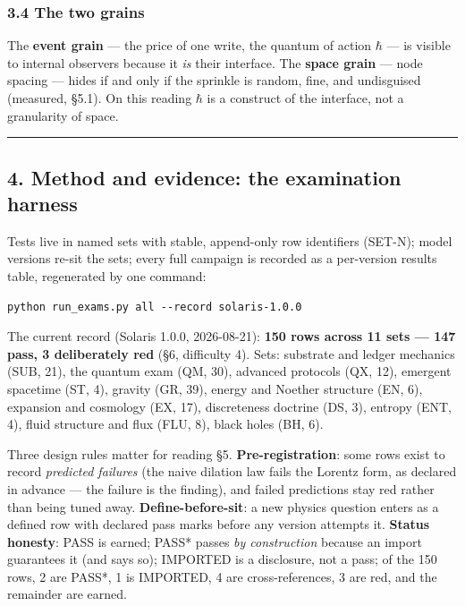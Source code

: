 \documentclass[
  11pt,
]{article}
\begin{document}
\subsubsection{3.4 The two grains}\label{the-two-grains}

The \textbf{event grain} --- the price of one write, the quantum of
action $\hbar$ --- is visible to internal observers because it \emph{is} their
interface. The \textbf{space grain} --- node spacing --- hides if and
only if the sprinkle is random, fine, and undisguised (measured, \S{}5.1).
On this reading $\hbar$ is a construct of the interface, not a granularity of
space.

\begin{center}\rule{0.5\linewidth}{0.5pt}\end{center}

\subsection{4. Method and evidence: the examination
harness}\label{method-and-evidence-the-examination-harness}

Tests live in named sets with stable, append-only row identifiers
(SET-N); model versions re-sit the sets; every full campaign is recorded
as a per-version results table, regenerated by one command:

\begin{verbatim}
python run_exams.py all --record solaris-1.0.0
\end{verbatim}

The current record (Solaris 1.0.0, 2026-08-21): \textbf{150 rows across
11 sets --- 147 pass, 3 deliberately red} (\S{}6, difficulty 4). Sets:
substrate and ledger mechanics (SUB, 21), the quantum exam (QM, 30),
advanced protocols (QX, 12), emergent spacetime (ST, 4), gravity (GR,
39), energy and Noether structure (EN, 6), expansion and cosmology (EX,
17), discreteness doctrine (DS, 3), entropy (ENT, 4), fluid structure
and flux (FLU, 8), black holes (BH, 6).

Three design rules matter for reading \S{}5. \textbf{Pre-registration}:
some rows exist to record \emph{predicted failures} (the naive dilation
law fails the Lorentz form, as declared in advance --- the failure is
the finding), and failed predictions stay red rather than being tuned
away. \textbf{Define-before-sit}: a new physics question enters as a
defined row with declared pass marks before any version attempts it.
\textbf{Status honesty}: PASS is earned; PASS* passes \emph{by
construction} because an import guarantees it (and says so); IMPORTED is
a disclosure, not a pass; of the 150 rows, 2 are PASS*, 1 is IMPORTED, 4
are cross-references, 3 are red, and the remainder are earned.
\end{document}
